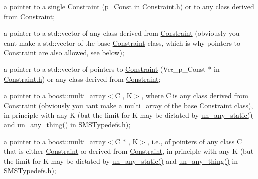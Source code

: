 \begin{DoxyItemize}
\item a pointer to a single \mbox{\hyperlink{class_s_m_spp__di__unipi__it_1_1_constraint}{Constraint}} (p\+\_\+\+Const in \mbox{\hyperlink{_constraint_8h}{Constraint.\+h}}) or to any class derived from \mbox{\hyperlink{class_s_m_spp__di__unipi__it_1_1_constraint}{Constraint}};
\item a pointer to a std\+::vector of any class derived from \mbox{\hyperlink{class_s_m_spp__di__unipi__it_1_1_constraint}{Constraint}} (obviously you can\textquotesingle{}t make a std\+::vector of the base \mbox{\hyperlink{class_s_m_spp__di__unipi__it_1_1_constraint}{Constraint}} class, which is why pointers to \mbox{\hyperlink{class_s_m_spp__di__unipi__it_1_1_constraint}{Constraint}} are also allowed, see below);
\item a pointer to a std\+::vector of pointers to \mbox{\hyperlink{class_s_m_spp__di__unipi__it_1_1_constraint}{Constraint}} (Vec\+\_\+p\+\_\+\+Const $\ast$ in \mbox{\hyperlink{_constraint_8h}{Constraint.\+h}}) or any class derived from \mbox{\hyperlink{class_s_m_spp__di__unipi__it_1_1_constraint}{Constraint}};
\item a pointer to a boost\+::multi\+\_\+array$<$\+C , K$>$, where C is any class derived from \mbox{\hyperlink{class_s_m_spp__di__unipi__it_1_1_constraint}{Constraint}} (obviously you can\textquotesingle{}t make a multi\+\_\+array of the base \mbox{\hyperlink{class_s_m_spp__di__unipi__it_1_1_constraint}{Constraint}} class), in principle with any K (but the limit for K may be dictated by \mbox{\hyperlink{group__boost__any__stuff_ga8ec1a694aa7a5fa58ab801c1ea419fa8}{un\+\_\+any\+\_\+static()}} and \mbox{\hyperlink{group__boost__any__stuff_gab299af634bc1ca9be3a8d45a14560036}{un\+\_\+any\+\_\+thing()}} in \mbox{\hyperlink{_s_m_s_typedefs_8h}{S\+M\+S\+Typedefs.\+h}});
\item a pointer to a boost\+::multi\+\_\+array$<$\+C $\ast$ , K$>$, i.\+e., of pointers of any class C that is either \mbox{\hyperlink{class_s_m_spp__di__unipi__it_1_1_constraint}{Constraint}} or derived from \mbox{\hyperlink{class_s_m_spp__di__unipi__it_1_1_constraint}{Constraint}}, in principle with any K (but the limit for K may be dictated by \mbox{\hyperlink{group__boost__any__stuff_ga8ec1a694aa7a5fa58ab801c1ea419fa8}{un\+\_\+any\+\_\+static()}} and \mbox{\hyperlink{group__boost__any__stuff_gab299af634bc1ca9be3a8d45a14560036}{un\+\_\+any\+\_\+thing()}} in \mbox{\hyperlink{_s_m_s_typedefs_8h}{S\+M\+S\+Typedefs.\+h}});
\end{DoxyItemize}

